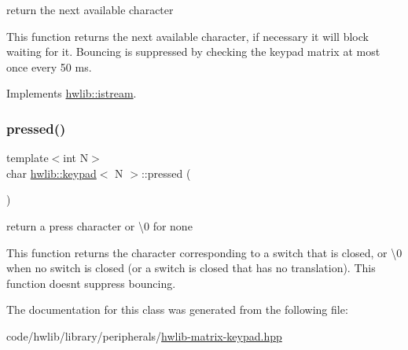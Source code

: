 return the next available character 

This function returns the next available character, if necessary it will block waiting for it. Bouncing is suppressed by checking the keypad matrix at most once every 50 ms. 

Implements \hyperlink{classhwlib_1_1istream_a9a260f800b08d4788b9e399f65d1c728}{hwlib\+::istream}.

\mbox{\label{classhwlib_1_1keypad_a34f0f6c0cea1702e84b9f20a9379d8a8}} 
\subsubsection{\texorpdfstring{pressed()}{pressed()}}
{\footnotesize\ttfamily template$<$int N$>$ \\
char \hyperlink{classhwlib_1_1keypad}{hwlib\+::keypad}$<$ N $>$\+::pressed (\begin{DoxyParamCaption}{ }\end{DoxyParamCaption})\hspace{0.3cm}{\ttfamily [inline]}}



return a press character or \textquotesingle{}\textbackslash{}0\textquotesingle{} for none 

This function returns the character corresponding to a switch that is closed, or \textquotesingle{}\textbackslash{}0\textquotesingle{} when no switch is closed (or a switch is closed that has no translation). This function doesn\textquotesingle{}t suppress bouncing. 

The documentation for this class was generated from the following file\+:\begin{DoxyCompactItemize}
\item 
code/hwlib/library/peripherals/\hyperlink{hwlib-matrix-keypad_8hpp}{hwlib-\/matrix-\/keypad.\+hpp}\end{DoxyCompactItemize}
